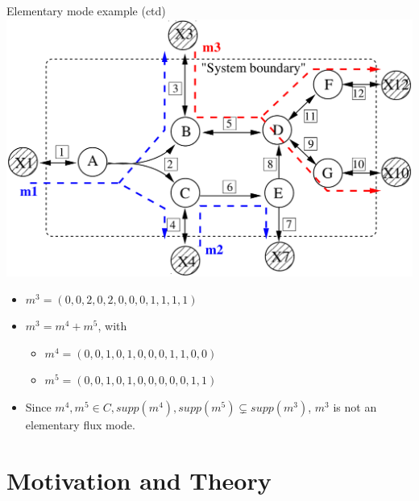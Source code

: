 \documentclass{beamer}
\begin{document}
\begin{frame}{Elementary mode example (ctd)}
    \includegraphics[width=.7\textwidth]{grafik/EMnet2}
    \begin{itemize}
        \item $m^{3} = (0, 0, 2, 0, 2, 0, 0, 0, 1, 1, 1 ,1)$
        \item $m^{3} = m^{4} + m^{5}$, with
        \begin{itemize}
            \item $ m^{4} = (0, 0, 1, 0, 1, 0, 0, 0, 1, 1, 0 ,0)$
            \item $ m^{5} = (0, 0, 1, 0, 1, 0, 0, 0, 0, 0, 1 ,1)$
        \end{itemize}
        \item Since $m^{4}, m^{5} \in C, supp(m^{4}), supp(m^{5}) \subsetneq supp(m^{3})$, $m^{3}$ is not an elementary flux mode.
    \end{itemize}
\end{frame}

\section{Motivation and Theory}
\end{document}
